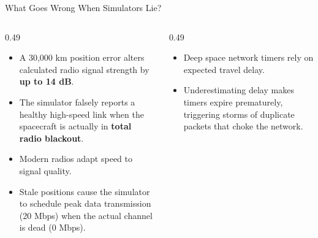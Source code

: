 \documentclass[aspectratio=169,10pt]{beamer}
\begin{document}
\begin{frame}{What Goes Wrong When Simulators Lie?}
  \begin{columns}[T]
    \begin{column}{0.49\textwidth}
      \begin{tcolorbox}[colback=lightRed,colframe=alertRed,title=\textbf{1. False Connection Predictions},top=1.5pt,bottom=1.5pt]
        \small
        \begin{itemize}\setlength{\itemsep}{0.8pt}
          \item A 30,000 km position error alters calculated radio signal strength by \textbf{up to 14 dB}.
          \item The simulator falsely reports a healthy high-speed link when the spacecraft is actually in \textbf{total radio blackout}.
        \end{itemize}
      \end{tcolorbox}

      \vspace{1.5pt}
      \begin{tcolorbox}[colback=lightGold,colframe=goldAccent,title=\textbf{2. Phantom Data Speeds},top=1.5pt,bottom=1.5pt]
        \small
        \begin{itemize}\setlength{\itemsep}{0.8pt}
          \item Modern radios adapt speed to signal quality.
          \item Stale positions cause the simulator to schedule peak data transmission (20 Mbps) when the actual channel is dead (0 Mbps).
        \end{itemize}
      \end{tcolorbox}
    \end{column}

    \begin{column}{0.49\textwidth}
      \begin{tcolorbox}[colback=lightCyan,colframe=electricCyan!80!black,title=\textbf{3. Panic Retransmission Storms},top=1.5pt,bottom=1.5pt]
        \small
        \begin{itemize}\setlength{\itemsep}{0.8pt}
          \item Deep space network timers rely on expected travel delay.
          \item Underestimating delay makes timers expire prematurely, triggering storms of duplicate packets that choke the network.
        \end{itemize}
      \end{tcolorbox}


\end{column}
\end{columns}
\end{frame}
\end{document}
